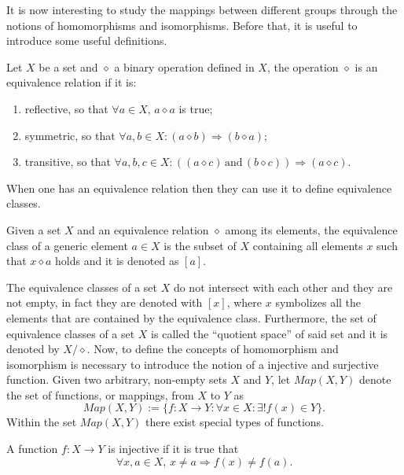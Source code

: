 It is now interesting to study the mappings between different groups through the notions of homomorphisms and isomorphisms. Before that, it is useful to introduce some useful definitions. 
\begin{defn}
    Let $X$ be a set and $\diamond$ a binary operation defined in $X$, the operation $\diamond$ is an equivalence relation if it is:
    \begin{enumerate}
        \item reflective, so that $\forall a \in X,\, a \diamond a$ is true;
        \item symmetric, so that $\forall a,b \in X : (a \diamond b)\Rightarrow(b \diamond a)$;
        \item transitive, so that $\forall a,b,c \in X : ((a \diamond c)\,\mathrm{and}\,(b \diamond c))\Rightarrow(a \diamond c)$.
    \end{enumerate}
\end{defn}
When one has an equivalence relation then they can use it to define equivalence classes.
\begin{defn}
    Given a set $X$ and an equivalence relation $\diamond$ among its elements, the equivalence class of a generic element $a \in X$ is the subset of $X$ containing all elements $x$ such that $x \diamond a$ holds and it is denoted as $[a]$.
\end{defn}
The equivalence classes of a set $X$ do not intersect with each other and they are not empty, in fact they are denoted with $[x]$, where $x$ symbolizes all the elements that are contained by the equivalence class. Furthermore, the set of equivalence classes of a set $X$ is called the ``quotient space'' of said set and it is denoted by $X/\diamond$. Now, to define the concepts of homomorphism and isomorphism is necessary to introduce the notion of a injective and surjective function. Given two arbitrary, non-empty sets $X$ and $Y$, let $Map(X,Y)$ denote the set of functions, or mappings, from $X$ to $Y$ as
\begin{equation}
\label{eq: definition of Map(X,Y)}
    Map(X,Y) := \{f : X \to Y : \forall x \in X : \exists! f(x) \in Y\}.
\end{equation}
Within the set $Map(X,Y)$ there exist special types of functions.
\begin{defn}
    A function $f : X \to Y$ is injective if it is true that
    \begin{equation}
        \forall x,a \in X,\, x \neq a \Rightarrow f(x) \neq f(a).
    \end{equation}
\end{defn}
